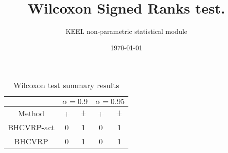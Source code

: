 \documentclass[a4paper,10pt]{article}
\title{Wilcoxon Signed Ranks test.}
\date{\today}
\author{KEEL non-parametric statistical module}
\begin{document}
\pagestyle{empty}
\maketitle
\thispagestyle{empty}


\begin{sidewaystable}[!htp]
\centering\scriptsize
{}
\caption{Ranks computed by the Wilcoxon test}

\end{sidewaystable}

 \clearpage 


\begin{sidewaystable}[!htp]
\centering\scriptsize
{}
\caption{Summary of the Wilcoxon test. \textbullet = the method in the row improves the method of the column. \textopenbullet = the method in the column improves the method of the row. Upper diagonal of level significance $\alpha=0.9$,Lower diagonal level of significance $\alpha=0.95$}

\end{sidewaystable}

 \clearpage 


\begin{table}[!htp]
\centering\scriptsize
\begin{tabular}{
|c|c|c|c|c|}
\hline
&\multicolumn{2}{c|}{$\alpha=0.9$} & \multicolumn{2}{c|}{$\alpha=0.95$}\\\hline
Method & + & $\pm$ & + & $\pm$ \\
\hline
BHCVRP-act & 0 & 1 & 0 & 1\\
\hline
BHCVRP & 0 & 1 & 0 & 1\\
\hline

\end{tabular}
\caption{Wilcoxon test summary results}

\end{table}

 \clearpage 
\end{document}
